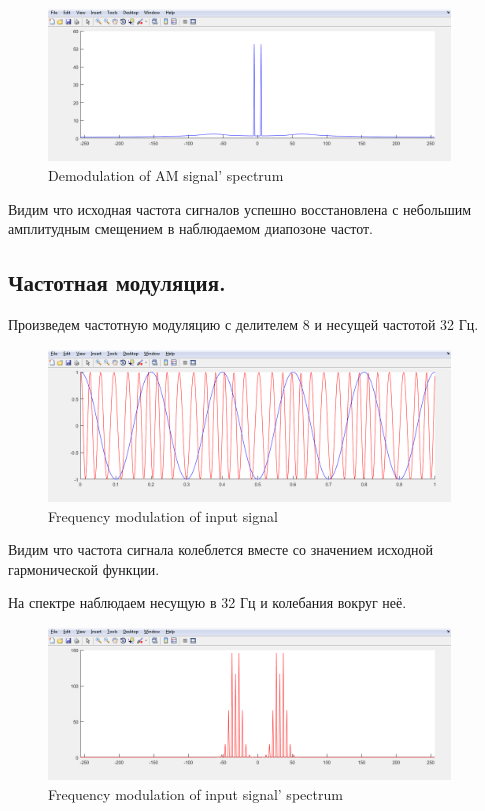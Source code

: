 \documentclass[a4paper,14pt]{extarticle}
\begin{document}
\begin{figure}[H]
\centering
\includegraphics[width=0.95\textwidth]{am_dm_sp}
\captionsetup{justification=centering,margin=1.0 cm}
\caption{Demodulation of AM signal' spectrum}
\label{any}
\end{figure}
Видим что исходная частота сигналов успешно восстановлена с небольшим амплитудным смещением в наблюдаемом диапозоне частот.

\subsection{Частотная модуляция.}

Произведем частотную модуляцию с делителем 8 и несущей частотой 32 Гц.

\begin{figure}[H]
\centering
\includegraphics[width=0.95\textwidth]{fm}
\captionsetup{justification=centering,margin=1.0 cm}
\caption{Frequency modulation of input signal}
\label{any}
\end{figure}
Видим что частота сигнала колеблется вместе со значением исходной гармонической функции.

На спектре наблюдаем несущую в 32 Гц и колебания вокруг неё.
\begin{figure}[H]
\centering
\includegraphics[width=0.95\textwidth]{fm_sp}
\captionsetup{justification=centering,margin=1.0 cm}
\caption{Frequency modulation of input signal' spectrum}
\label{any}
\end{figure}
\end{document}
